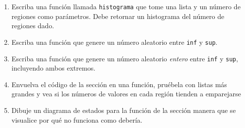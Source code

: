 \begin{enumerate}

 \item Escriba una función llamada \texttt{histograma} que
tome una lista y un número de regiones como parámetros. Debe retornar
un histograma del número de regiones dado.

 \item Escriba una función que genere un número aleatorio entre \texttt{inf} y
\texttt{sup}.
 
 \item Escriba una función que genere un número aleatorio {\em entero}
entre \texttt{inf} y  \texttt{sup}, incluyendo ambos extremos.

 \item Envuelva el código de la sección en una función, 
pruébela con listas más grandes y vea si los números
de valores en cada región tienden a emparejarse

 \item Dibuje un diagrama de estados para la función de la sección
manera que se visualice por qué no funciona como debería.
\end{enumerate}
